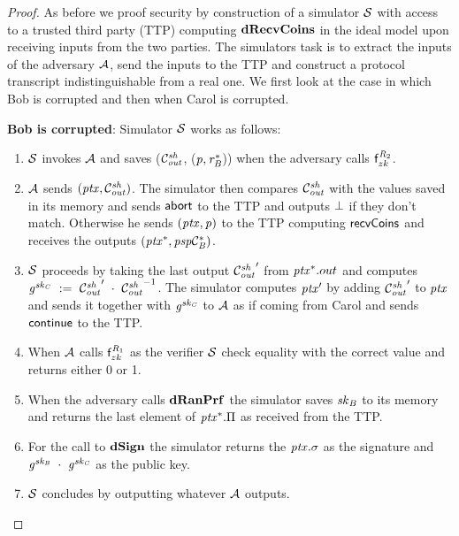 \begin{proof}
    As before we proof security by construction of a simulator $\mathcal{S}$ with access to a trusted third party (TTP) computing $\mathbf{dRecvCoins}$ in the ideal model upon receiving inputs from the two parties.
    The simulators task is to extract the inputs of the adversary $\mathcal{A}$, send the inputs to the TTP and construct a protocol transcript indistinguishable from a real one.
    We first look at the case in which Bob is corrupted and then when Carol is corrupted.

    \textbf{Bob is corrupted}: Simulator $\mathcal{S}$ works as follows:
    \begin{enumerate}
        \item $\mathcal{S}$ invokes $\mathcal{A}$ and saves ($\mathcal{C}_{\mathit{out}}^{\mathit{sh}}$, ($\mathit{p}, \mathit{r}_{\mathit{B}}^*$)) when the adversary calls $\mathsf{f}^{\mathit{R}_2}_{zk}$.
        \item $\mathcal{A}$ sends $(\mathit{ptx},\mathcal{C}_{\mathit{out}}^{\mathit{sh}})$.
        The simulator then compares $\mathcal{C}_{\mathit{out}}^{\mathit{sh}}$ with the values saved in its memory and sends $\mathsf{abort}$ to the TTP and outputs $\bot$ if they don't match.
        Otherwise he sends $(\mathit{ptx}, \mathit{p})$ to the TTP computing $\mathsf{recvCoins}$ and receives the outputs $(\mathit{ptx}^*, \mathit{psp}\mathcal{C}_{\mathit{B}}^*)$.
        \item $\mathcal{S}$ proceeds by taking the last output ${\mathcal{C}_{\mathit{out}}^{\mathit{sh}}}'$ from $\mathit{ptx}^*.out$ and computes $\mathit{g}^{\mathit{sk}_{\mathit{C}}} ~:=~ {\mathcal{C}_{\mathit{out}}^{\mathit{sh}}}' ~\cdot~ {\mathcal{C}_{\mathit{out}}^{\mathit{sh}}}^{-1}$.
        The simulator computes ${\mathit{ptx}}'$ by adding ${\mathcal{C}_{\mathit{out}}^{\mathit{sh}}}'$ to $\mathit{ptx}$ and sends it together with $\mathit{g}^{\mathit{sk}_{\mathit{C}}}$ to $\mathcal{A}$ as if coming from Carol and sends $\mathsf{continue}$ to the TTP.
        \item When $\mathcal{A}$ calls $\mathsf{f}^{\mathit{R}_1}_{zk}$ as the verifier $\mathcal{S}$ check equality with the correct value and returns either 0 or 1.
        \item When the adversary calls $\mathbf{dRanPrf}$ the simulator saves $\mathit{sk}_{\mathit{B}}$ to its memory and returns the last element of $\mathit{ptx}^*.\Pi$ as received from the TTP.
        \item For the call to $\mathbf{dSign}$ the simulator returns the $\mathit{ptx}.\sigma$ as the signature and $\mathit{g}^{\mathit{sk}_{\mathit{B}}} ~\cdot~ \mathit{g}^{\mathit{sk}_{\mathit{C}}}$ as the public key.
        \item $\mathcal{S}$ concludes by outputting whatever $\mathcal{A}$ outputs.
    \end{enumerate}


\end{proof}
